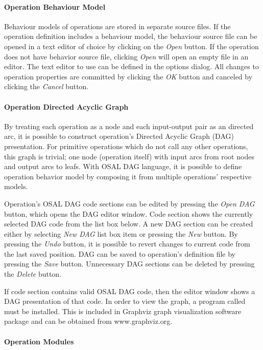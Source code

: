 \documentclass[a4paper,twoside]{tceusermanual}
\begin{document}
\paragraph{Operation Behaviour Model}

Behaviour models of operations are stored in separate source files.  If the
operation definition includes a behaviour model, the behaviour source file
can be opened in a text editor of choice by clicking on the \emph{Open}
button. If the operation does not have behavior source file, clicking
\emph{Open} will open an empty file in an editor. The text editor to use can
be defined in the options dialog. All changes to operation properties are 
committed by clicking the \emph{OK} button and canceled by clicking the \emph{Cancel} 
button.

\paragraph{Operation Directed Acyclic Graph}

By treating each operation as a node and each input-output pair as an directed
arc, it is possible to construct operation's Directed Acyclic Graph (DAG)
presentation. For primitive operations which do not call any other operations,
this graph is trivial; one node (operation itself) with input arcs from root
nodes and output arcs to leafs. With OSAL DAG language, it is possible to
define operation behavior model by composing it from multiple operations'
respective models.

Operation's OSAL DAG code sections can be edited by pressing the \emph{Open DAG}
button, which opens the DAG editor window. Code section shows the currently
selected DAG code from the list box below. A new DAG section can be created
either by selecting \emph{New DAG} list box item or pressing the \emph{New} button.
By pressing the \emph{Undo} button, it is possible to revert changes to current
code from the last saved position. DAG can be saved to operation's definition
file by pressing the \emph{Save} button. Unnecessary DAG sections can be deleted
by pressing the \emph{Delete} button.

If code section contains valid OSAL DAG code, then the editor window shows
a DAG presentation of that code.  In order to view the graph, a
program called  must be installed. This is included in Graphviz graph
visualization software package and can be obtained from www.graphviz.org. 

\paragraph{Operation Modules}
\end{document}
